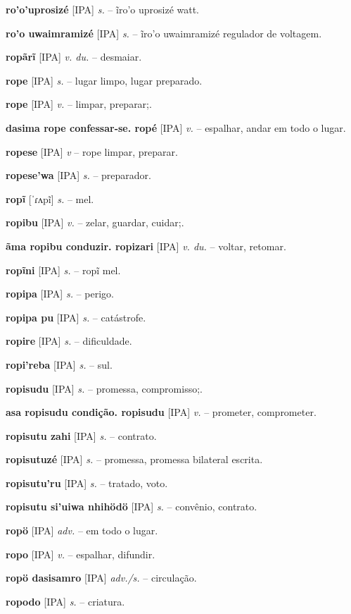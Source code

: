 \textbf{ro'o'uprosizé} [IPA] \textit{s.} -- ĩro'o uprosizé watt.

\textbf{ro'o uwaimramizé} [IPA] \textit{s.} -- ĩro'o uwaimramizé regulador de voltagem.

\textbf{ropãrĩ} [IPA] \textit{v. du.} -- desmaiar.

\textbf{rope} [IPA] \textit{s.} -- lugar limpo, lugar preparado.

\textbf{rope} [IPA] \textit{v.} -- limpar, preparar;.

\textbf{dasima rope confessar-se. ropé} [IPA] \textit{v.} -- espalhar, andar em todo o lugar.

\textbf{ropese} [IPA] \textit{v} -- rope limpar, preparar.

\textbf{ropese'wa} [IPA] \textit{s.} -- preparador.

\textbf{ropĩ} [ˈɾʌpĩ] \textit{s.} -- mel.

\textbf{ropibu} [IPA] \textit{v.} -- zelar, guardar, cuidar;.

\textbf{ãma ropibu conduzir. ropizari} [IPA] \textit{v. du.} -- voltar, retomar.

\textbf{ropĩni} [IPA] \textit{s.} -- ropĩ mel.

\textbf{ropipa} [IPA] \textit{s.} -- perigo.

\textbf{ropipa pu} [IPA] \textit{s.} -- catástrofe.

\textbf{ropire} [IPA] \textit{s.} -- dificuldade.

\textbf{ropi'reba} [IPA] \textit{s.} -- sul.

\textbf{ropisudu} [IPA] \textit{s.} -- promessa, compromisso;.

\textbf{asa ropisudu condição. ropisudu} [IPA] \textit{v.} -- prometer, comprometer.

\textbf{ropisutu zahi} [IPA] \textit{s.} -- contrato.

\textbf{ropisutuzé} [IPA] \textit{s.} -- promessa, promessa bilateral escrita.

\textbf{ropisutu'ru} [IPA] \textit{s.} -- tratado, voto.

\textbf{ropisutu si'uiwa nhihödö} [IPA] \textit{s.} -- convênio, contrato.

\textbf{ropö} [IPA] \textit{adv.} -- em todo o lugar.

\textbf{ropo} [IPA] \textit{v.} -- espalhar, difundir.

\textbf{ropö dasisamro} [IPA] \textit{adv./s.} -- circulação.

\textbf{ropodo} [IPA] \textit{s.} -- criatura.

